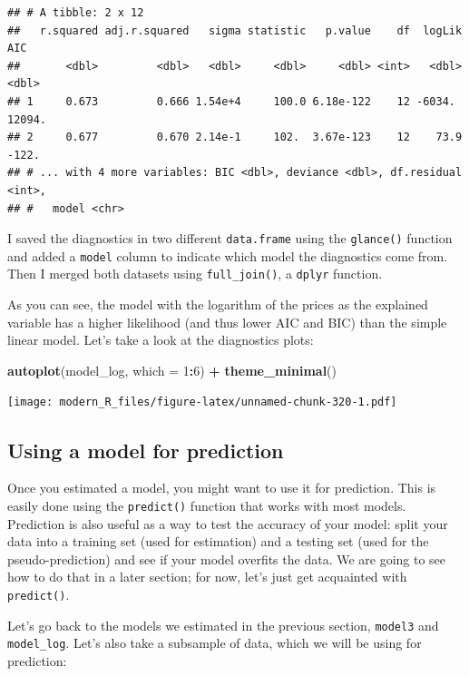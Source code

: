 \documentclass[]{gitbook}
\newenvironment{Shaded}{\begin{snugshade}}{\end{snugshade}}
\newcommand{\DataTypeTok}[1]{\textcolor[rgb]{0.13,0.29,0.53}{#1}}
\newcommand{\DecValTok}[1]{\textcolor[rgb]{0.00,0.00,0.81}{#1}}
\newcommand{\KeywordTok}[1]{\textcolor[rgb]{0.13,0.29,0.53}{\textbf{#1}}}
\newcommand{\NormalTok}[1]{#1}
\newcommand{\OperatorTok}[1]{\textcolor[rgb]{0.81,0.36,0.00}{\textbf{#1}}}
\newcommand{\StringTok}[1]{\textcolor[rgb]{0.31,0.60,0.02}{#1}}
\theoremstyle{definition}
\theoremstyle{definition}
\theoremstyle{definition}
\theoremstyle{remark}
\begin{document}
\begin{verbatim}
## # A tibble: 2 x 12
##   r.squared adj.r.squared   sigma statistic   p.value    df  logLik     AIC
##       <dbl>         <dbl>   <dbl>     <dbl>     <dbl> <int>   <dbl>   <dbl>
## 1     0.673         0.666 1.54e+4     100.0 6.18e-122    12 -6034.   12094.
## 2     0.677         0.670 2.14e-1     102.  3.67e-123    12    73.9   -122.
## # ... with 4 more variables: BIC <dbl>, deviance <dbl>, df.residual <int>,
## #   model <chr>
\end{verbatim}

I saved the diagnostics in two different \texttt{data.frame} using the
\texttt{glance()} function and added a \texttt{model} column to indicate
which model the diagnostics come from. Then I merged both datasets using
\texttt{full\_join()}, a \texttt{dplyr} function.

As you can see, the model with the logarithm of the prices as the
explained variable has a higher likelihood (and thus lower AIC and BIC)
than the simple linear model. Let's take a look at the diagnostics
plots:

\begin{Shaded}
\begin{Highlighting}[]
\KeywordTok{autoplot}\NormalTok{(model_log, }\DataTypeTok{which =} \DecValTok{1}\OperatorTok{:}\DecValTok{6}\NormalTok{) }\OperatorTok{+}\StringTok{ }\KeywordTok{theme_minimal}\NormalTok{()}
\end{Highlighting}
\end{Shaded}

\texttt{[image: modern\_R\_files/figure-latex/unnamed-chunk-320-1.pdf]}

\hypertarget{using-a-model-for-prediction}{%
\subsection{Using a model for
prediction}\label{using-a-model-for-prediction}}

Once you estimated a model, you might want to use it for prediction.
This is easily done using the \texttt{predict()} function that works
with most models. Prediction is also useful as a way to test the
accuracy of your model: split your data into a training set (used for
estimation) and a testing set (used for the pseudo-prediction) and see
if your model overfits the data. We are going to see how to do that in a
later section; for now, let's just get acquainted with
\texttt{predict()}.

Let's go back to the models we estimated in the previous section,
\texttt{model3} and \texttt{model\_log}. Let's also take a subsample of
data, which we will be using for prediction:
\end{document}

